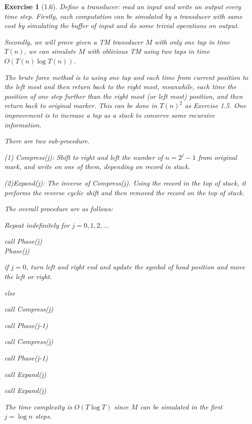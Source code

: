 \documentclass[a4paper]{article}
\newtheorem*{exercise}{Exercise}
\begin{document}
\begin{exercise}[1.6]

Define a transducer: read an input and write an output every time step. Firstly, each computation can be simulated by a transducer with same cost by simulating the buffer of input and do some trivial operations on output.

Secondly, we will prove given a TM transducer $M$ with only one tap in time $T(n)$, we can simulate $M$ with oblivious TM using two taps in time $O(T(n)\log T(n))$.

The brute force method is to using one tap and each time from current position to the left  most and then return back to the right most, meanwhile, each time the position of one step further than the right most (or left most) position, and then return back to original marker. This can be done in $T(n)^{2}$ as Exercise 1.5. One improvement is to increase a tap as a stack to conserve some recursive information.

There are two sub-procedure.

(1) Compress(j): Shift to right and left the number of $n = 2^{j} - 1$ from original mark, and write on one of them, depending on record in stack.

(2)Expand(j): The inverse of Compress(j). Using the record in the top of stack, it preforms the reverse cyclic shift and then removed the record on the top of stack.

The overall procedure are as follows:

Repeat indefinitely for $j = 0, 1, 2, ...$

call Phase(j)\\
Phase(j)

\quad if $j = 0$, turn left and right end and update the symbol of head position and move the left or right.

\quad else 

\quad \quad call Compress(j)

\quad \quad call Phase(j-1)

\quad \quad call Compress(j)

\quad \quad call Phase(j-1)

\quad \quad call Expand(j)

\quad \quad call Expand(j)

The time complexity is $O(T\log T)$ since $M$ can be simulated in the first $j = \log n$ steps.
\end{exercise}
\end{document}
